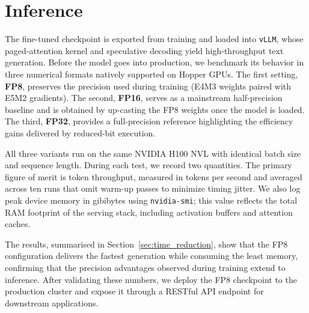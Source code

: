 \section{Inference}\label{sec:inference}

The fine-tuned checkpoint is exported from training and loaded into \texttt{vLLM}, whose paged-attention kernel and speculative decoding yield high-throughput text generation. Before the model goes into production, we benchmark its behavior in three numerical formats natively supported on Hopper GPUs. The first setting, \textbf{FP8}, preserves the precision used during training (E4M3 weights paired with E5M2 gradients). The second, \textbf{FP16}, serves as a mainstream half-precision baseline and is obtained by up-casting the FP8 weights once the model is loaded. The third, \textbf{FP32}, provides a full-precision reference highlighting the efficiency gains delivered by reduced-bit execution.

All three variants run on the same NVIDIA H100 NVL with identical batch size and sequence length. During each test, we record two quantities. The primary figure of merit is token throughput, measured in tokens per second and averaged across ten runs that omit warm-up passes to minimize timing jitter. We also log peak device memory in gibibytes using \texttt{nvidia-smi}; this value reflects the total RAM footprint of the serving stack, including activation buffers and attention caches.

The results, summarised in Section~\ref{sec:time_reduction}, show that the FP8 configuration delivers the fastest generation while consuming the least memory, confirming that the precision advantages observed during training extend to inference. After validating these numbers, we deploy the FP8 checkpoint to the production cluster and expose it through a RESTful API endpoint for downstream applications.
